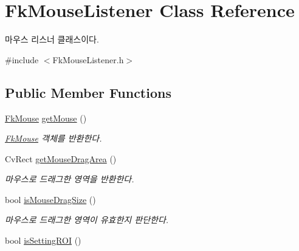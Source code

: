 \hypertarget{class_fk_mouse_listener}{}\section{Fk\+Mouse\+Listener Class Reference}
\label{class_fk_mouse_listener}


마우스 리스너 클래스이다.  




{\ttfamily \#include $<$Fk\+Mouse\+Listener.\+h$>$}

\subsection*{Public Member Functions}
\begin{DoxyCompactItemize}
\item 
\hypertarget{class_fk_mouse_listener_a90c8009bd76be8cc41a331c2712cbb1b}{}\hyperlink{class_fk_mouse}{Fk\+Mouse} \hyperlink{class_fk_mouse_listener_a90c8009bd76be8cc41a331c2712cbb1b}{get\+Mouse} ()\label{class_fk_mouse_listener_a90c8009bd76be8cc41a331c2712cbb1b}

\begin{DoxyCompactList}\small\item\em \hyperlink{class_fk_mouse}{Fk\+Mouse} 객체를 반환한다. \end{DoxyCompactList}\item 
\hypertarget{class_fk_mouse_listener_a66c57af7aafe0bfa916c95b79ea9cce6}{}Cv\+Rect \hyperlink{class_fk_mouse_listener_a66c57af7aafe0bfa916c95b79ea9cce6}{get\+Mouse\+Drag\+Area} ()\label{class_fk_mouse_listener_a66c57af7aafe0bfa916c95b79ea9cce6}

\begin{DoxyCompactList}\small\item\em 마우스로 드래그한 영역을 반환한다. \end{DoxyCompactList}\item 
\hypertarget{class_fk_mouse_listener_a888c11b7fe5fa2652465768ae48737e5}{}bool \hyperlink{class_fk_mouse_listener_a888c11b7fe5fa2652465768ae48737e5}{is\+Mouse\+Drag\+Size} ()\label{class_fk_mouse_listener_a888c11b7fe5fa2652465768ae48737e5}

\begin{DoxyCompactList}\small\item\em 마우스로 드래그한 영역이 유효한지 판단한다. \end{DoxyCompactList}\item 
\hypertarget{class_fk_mouse_listener_a2874586a302a757504ff4b755490f8be}{}bool \hyperlink{class_fk_mouse_listener_a2874586a302a757504ff4b755490f8be}{is\+Setting\+R\+O\+I} ()\label{class_fk_mouse_listener_a2874586a302a757504ff4b755490f8be}


\end{DoxyCompactItemize}
